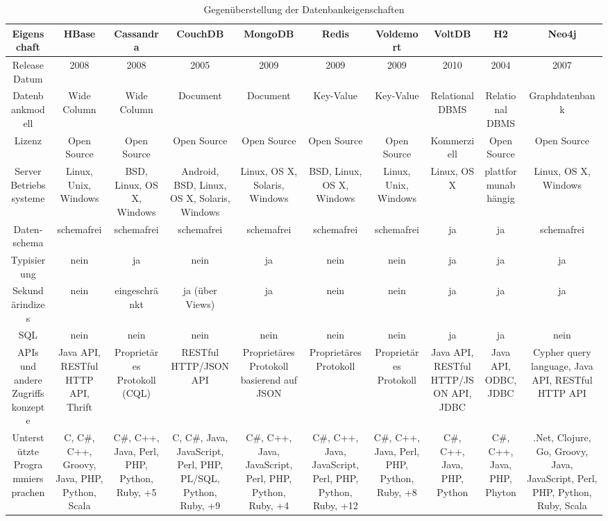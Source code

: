 \begin{table}[H]
\tiny
\caption{Gegenüberstellung der Datenbankeigenschaften}
\label{tb_charakteristika}
\setlength{\tabcolsep}{1mm}
\begin{tabulary} {\linewidth} {C | C | C | C | C | C | C | C | C | C}
\toprule
Eigenschaft & HBase & Cassandra & CouchDB & MongoDB & Redis & Voldemort & VoltDB & H2 & Neo4j\\  
\midrule
Release Datum & 2008 & 2008 & 2005 & 2009 & 2009 & 2009 & 2010 & 2004 & 2007\\
\midrule
Datenbankmodell & Wide Column & Wide Column & Document & Document & Key-Value & Key-Value& Relational DBMS & Relational DBMS & Graphdatenbank\\
\midrule
Lizenz & Open Source & Open Source & Open Source & Open Source & Open Source & Open Source & Kommerziell & Open Source & Open Source\\
\midrule
Server Betriebssysteme & Linux, Unix, Windows & BSD, Linux, OS X, Windows & Android, BSD, Linux, OS X, Solaris, Windows & Linux, OS X, Solaris, Windows & BSD, Linux, OS X, Windows & Linux, Unix, Windows & Linux, OS X & plattformunabhängig & Linux, OS X, Windows\\
\midrule
Daten-schema & schemafrei & schemafrei & schemafrei & schemafrei & schemafrei & schemafrei & ja & ja & schemafrei\\
\midrule
Typisierung & nein & ja & nein & ja & nein & nein & ja & ja & ja\\
\midrule
Sekundärindizes & nein & eingeschränkt & ja (über Views) & ja & nein & nein & ja & ja & ja\\
\midrule
SQL & nein & nein & nein & nein & nein & nein & ja & ja & nein\\
\midrule
APIs und andere Zugriffskonzepte & Java API, RESTful HTTP API, Thrift & Proprietäres Protokoll (CQL) & RESTful HTTP/JSON API & Proprietäres Protokoll basierend auf JSON & Proprietäres Protokoll & Proprietäres Protokoll & Java API, RESTful HTTP/JSON API, JDBC & Java API, ODBC, JDBC & Cypher query language, Java API, RESTful HTTP API\\
\midrule
Unterstützte Programmiersprachen & C, C\#, C++, Groovy, Java, PHP, Python, Scala & C\#, C++, Java, Perl, PHP, Python, Ruby, +5 & C, C\#, Java, JavaScript, Perl, PHP, PL/SQL, Python, Ruby, +9 & C\#, C++, Java, JavaScript, Perl, PHP, Python, Ruby, +4 & C\#, C++, Java, JavaScript, Perl, PHP, Python, Ruby, +12 & C\#, C++, Java, Perl, PHP, Python, Ruby, +8 & C\#, C++, Java, PHP, Python & C\#, C++, Java, PHP, Phyton & .Net, Clojure, Go,  Groovy, Java, JavaScript, Perl, PHP, Python, Ruby, Scala \\

\end{tabulary}
\end{table}
